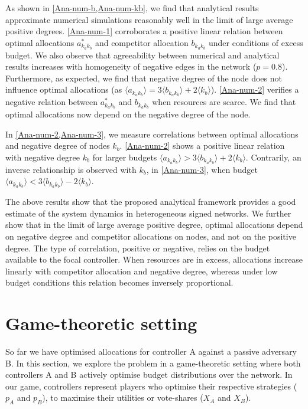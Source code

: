 As shown in \cref{Ana-num-b,Ana-num-kb}, we find that analytical results approximate numerical simulations reasonably well in the limit of large average positive degrees. 
\cref{Ana-num-1} corroborates a positive linear relation between optimal allocations $a_{k_{a}k_{b}}^*$ and competitor allocation $b_{k_{a}k_{b}}$ under conditions of excess budget. We also observe that agreeability between numerical and analytical results increases with homogeneity of negative edges in the network ($p=0.8$). Furthermore, as expected, we find that negative degree of the node does not influence optimal allocations (as $\langle a_{k_{a}k_{b}} \rangle  = 3 \langle b_{k_{a}k_{b}} \rangle + 2\langle k_{b} \rangle$). \cref{Ana-num-2} verifies a negative relation between $a_{k_{a}k_{b}}^*$ and $b_{k_{a}k_{b}}$ when resources are scarce. We find that optimal allocations now depend on the negative degree of the node.

In \cref{Ana-num-2,Ana-num-3}, we measure correlations between optimal allocations and negative degree of nodes $k_{b}$. \cref{Ana-num-2} shows a positive linear relation with negative degree $k_{b}$ for larger budgets $ \langle a_{k_{a}k_{b}} \rangle > 3 \langle b_{k_{a}k_{b}} \rangle + 2\langle k_{b} \rangle$. 
Contrarily, an inverse relationship is observed with $k_{b}$, in \cref{Ana-num-3}, when budget $\langle a_{k_{a}k_{b}} \rangle < 3 \langle b_{k_{a}k_{b}} \rangle  - 2\langle k_{b} \rangle$.

The above results show that the proposed analytical framework provides a good estimate of the system dynamics in heterogeneous signed networks. We further show that in the limit of large average positive degree, optimal allocations depend on negative degree and competitor allocations on nodes, and not on the positive degree. The type of correlation, positive or negative, relies on the budget available to the focal controller. When resources are in excess, allocations increase linearly with competitor allocation and negative degree, whereas under low budget conditions this relation becomes inversely proportional.  



\section{Game-theoretic setting}
\label{game-theory}
So far we have optimised allocations for controller A against a passive adversary B. In this section, we explore the problem in a game-theoretic setting where both controllers A and B actively optimise budget distributions over the network. In our game, controllers represent players who optimise their respective strategies ($p_{A}$ and $p_{B}$), to maximise their utilities or vote-shares ($X_{A}$ and $X_{B}$). 

